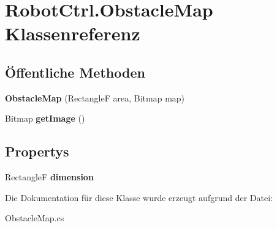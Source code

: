 \hypertarget{class_robot_ctrl_1_1_obstacle_map}{
\section{RobotCtrl.ObstacleMap Klassenreferenz}
\label{class_robot_ctrl_1_1_obstacle_map}
}
\subsection*{Öffentliche Methoden}
\begin{DoxyCompactItemize}
\item 
\hypertarget{class_robot_ctrl_1_1_obstacle_map_aa685bbf8cef8ae30c8a2a59a602f44b9}{
{\bfseries ObstacleMap} (RectangleF area, Bitmap map)}
\label{class_robot_ctrl_1_1_obstacle_map_aa685bbf8cef8ae30c8a2a59a602f44b9}

\item 
\hypertarget{class_robot_ctrl_1_1_obstacle_map_a6331e9073a17ee26ba3e272f4f20122f}{
Bitmap {\bfseries getImage} ()}
\label{class_robot_ctrl_1_1_obstacle_map_a6331e9073a17ee26ba3e272f4f20122f}

\end{DoxyCompactItemize}
\subsection*{Propertys}
\begin{DoxyCompactItemize}
\item 
\hypertarget{class_robot_ctrl_1_1_obstacle_map_a62cd370edbb98ccfd63af84f52c92e34}{
RectangleF {\bfseries dimension}}
\label{class_robot_ctrl_1_1_obstacle_map_a62cd370edbb98ccfd63af84f52c92e34}

\end{DoxyCompactItemize}


Die Dokumentation für diese Klasse wurde erzeugt aufgrund der Datei:\begin{DoxyCompactItemize}
\item 
ObstacleMap.cs\end{DoxyCompactItemize}

